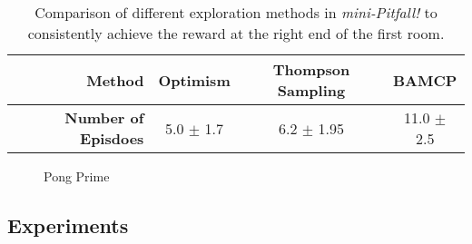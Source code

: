 \begin{table}[tb]
  \begin{center}
    \begin{tabular}{r|c|c|c}
      \toprule 
      \textbf{Method} & Optimism & Thompson Sampling & BAMCP\\
      \midrule
      \textbf{Number of Episdoes} & 5.0 $\pm$ 1.7 & 6.2 $\pm$ 1.95 & 11.0 $\pm$ 2.5\\       
      \bottomrule %
      \end{tabular}
      
  \end{center}
  \caption{Comparison of different exploration methods in \textit{mini-Pitfall!} to consistently achieve the reward at the right end of the first room.}
  \label{tab:mini_pitfall}
\end{table}

\begin{figure}[tb]
    \centering
    \caption{Pong Prime}%
    \label{fig:pongp}%
\end{figure}

\subsection{Experiments}


